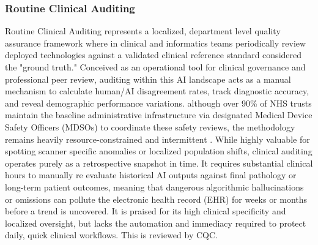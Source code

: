 \documentclass[11pt,a4paper]{article}
\begin{document}
\subsubsection{Routine Clinical Auditing}
\label{sec:Routine Clinical Auditing}
Routine Clinical Auditing represents a localized, department level quality assurance framework where in clinical and informatics teams periodically review deployed technologies against a validated clinical reference standard considered the  "ground truth." Conceived as an operational tool for clinical governance and professional peer review, auditing within this AI landscape acts as a manual mechanism to calculate human/AI disagreement rates, track diagnostic accuracy, and reveal demographic performance variations. although over 90\% of NHS trusts maintain the baseline administrative infrastructure via designated Medical Device Safety Officers (MDSOs) to coordinate these safety reviews, the methodology remains heavily resource-constrained and intermittent \cite{bsir2026} . While highly valuable for spotting scanner specific anomalies or localized population shifts, clinical auditing operates purely as a retrospective snapshot in time. It requires substantial clinical hours to manually re evaluate historical AI outputs against final pathology or long-term patient outcomes, meaning that dangerous algorithmic hallucinations or omissions can pollute the electronic health record (EHR) for weeks or months before a trend is uncovered. It is praised for its high clinical specificity and localized oversight, but lacks the automation and immediacy required to protect daily, quick clinical workflows. This is reviewed by CQC.
\end{document}
